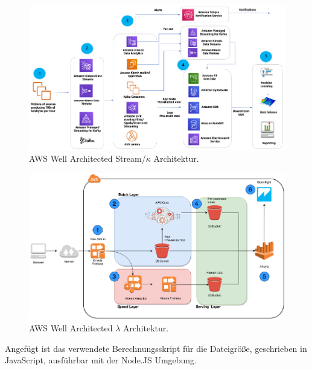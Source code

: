 \begin{figure}[H]
\centering
\includegraphics[width=0.92\textheight,angle=90,origin=c]{graphics/AWS-Stream-Architecture.pdf}
\caption[AWS Well Architected Stream/$\kappa$ Architektur]{AWS Well Architected Stream/$\kappa$ Architektur.\footnotemark}
\label{abb:AWSWellArchitectedStream}
\end{figure}

\begin{figure}[H]
\centering
\includegraphics[width=0.92\textheight,angle=90,origin=c]{graphics/AWS-Lambda-Architecture.pdf}
\caption[AWS Well Architected $\lambda$ Architektur]{AWS Well Architected $\lambda$ Architektur.\footnotemark}
\label{abb:AWSWellArchitectedLambda}
\end{figure}

\label{anhang:berechnung}
Angefügt ist das verwendete Berechnungsskript für die Dateigröße, geschrieben in JavaScript, ausführbar mit der Node.JS Umgebung.

